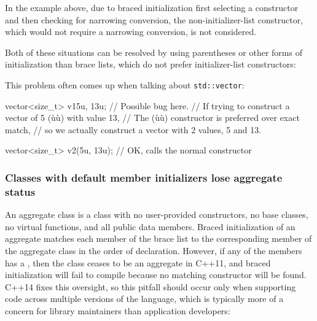 

\noindent In the example above, due to braced initialization first selecting a
constructor and then checking for narrowing conversion, the
non-initializer-list constructor, which would not require a narrowing
conversion, is not considered.

Both of these situations can be resolved by using parentheses or other
forms of initialization than brace lists, which do not prefer
initializer-list constructors:


\noindent This problem often comes up when talking about \lstinline!std::vector!:

\begin{emcppslisting}
vector<size_t> v1{5u, 13u};  // Possible bug here.
  // If trying to construct a vector of 5 (ù{}ù) with value 13,
  // The (ù{}ù) constructor is preferred over exact match,
  // so we actually construct a vector with 2 values, 5 and 13.

vector<size_t> v2(5u, 13u);  // OK, calls the normal constructor
\end{emcppslisting}


\subsubsection[Classes with default member initializers lose aggregate status]{Classes with default member initializers lose aggregate status}\label{classes-with-default-member-initializers-lose-aggregate-status}

An aggregate class is a class with no user-provided constructors, no
base classes, no virtual functions, and all public data members. Braced
initialization of an aggregate matches each member of the brace list to
the corresponding member of the aggregate class in the order of
declaration. However, if any of the members has a , then the class ceases to be an aggregate in
C++11, and braced initialization will fail to compile because no
matching constructor will be found. C++14 fixes this oversight, so this
pitfall should occur only when supporting code across multiple versions
of the language, which is typically more of a concern for library
maintainers than application developers:

